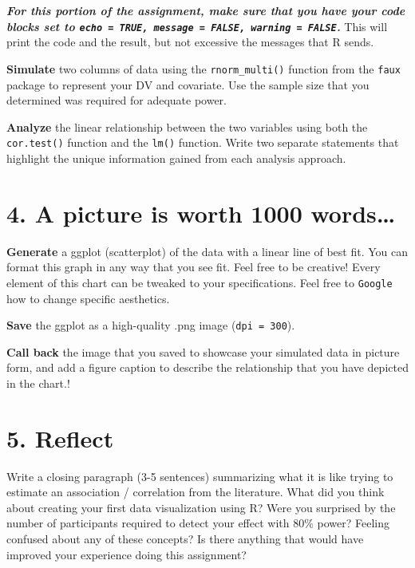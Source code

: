 \documentclass[
]{book}
\begin{document}
\textbf{\emph{For this portion of the assignment, make sure that you have your code blocks set to \texttt{echo\ =\ TRUE,\ message\ =\ FALSE,\ warning\ =\ FALSE}.}} This will print the code and the result, but not excessive the messages that R sends.

\textbf{Simulate} two columns of data using the \texttt{rnorm\_multi()} function from the \texttt{faux} package to represent your DV and covariate. Use the sample size that you determined was required for adequate power.

\textbf{Analyze} the linear relationship between the two variables using both the \texttt{cor.test()} function and the \texttt{lm()} function. Write two separate statements that highlight the unique information gained from each analysis approach.

\section*{4. A picture is worth 1000 words\ldots{}}\label{a-picture-is-worth-1000-words}

\textbf{Generate} a ggplot (scatterplot) of the data with a linear line of best fit. You can format this graph in any way that you see fit. Feel free to be creative! Every element of this chart can be tweaked to your specifications. Feel free to \texttt{Google} how to change specific aesthetics.

\textbf{Save} the ggplot as a high-quality .png image (\texttt{dpi\ =\ 300}).

\textbf{Call back} the image that you saved to showcase your simulated data in picture form, and add a figure caption to describe the relationship that you have depicted in the chart.!

\section*{5. Reflect}\label{reflect-3}

Write a closing paragraph (3-5 sentences) summarizing what it is like trying to estimate an association / correlation from the literature. What did you think about creating your first data visualization using R? Were you surprised by the number of participants required to detect your effect with 80\% power? Feeling confused about any of these concepts? Is there anything that would have improved your experience doing this assignment?
\end{document}
